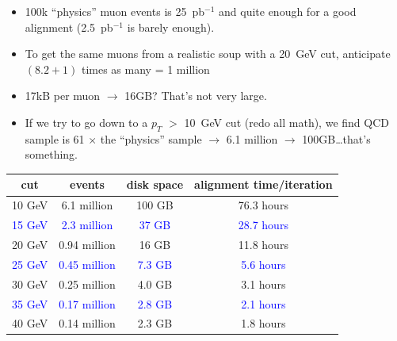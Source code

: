 \documentclass[compress]{beamer}
\begin{document}
\begin{frame}
\begin{itemize}
\item 100k ``physics'' muon events is 25~pb$^{-1}$ and quite enough for a good alignment (2.5~pb$^{-1}$ is barely enough).
\item To get the same muons from a realistic soup with a 20~GeV cut, anticipate $(8.2 + 1)$ times as many = 1 million
\item 17kB per muon $\to$ 16GB?  That's not very large.
\item If we try to go down to a $p_T$ $>$ 10~GeV cut (redo all math), we find QCD sample is 61 $\times$ the ``physics'' sample $\to$ 6.1 million $\to$ 100GB\ldots that's something.
\end{itemize}

\begin{center}
\begin{tabular}{c c c c}
cut & events & disk space & alignment time/iteration \\\hline
10 GeV & 6.1 million & 100 GB & 76.3 hours \\
\textcolor{blue}{15 GeV} & \textcolor{blue}{2.3 million} & \textcolor{blue}{37 GB} & \textcolor{blue}{28.7 hours} \\
20 GeV & 0.94 million & 16 GB & 11.8 hours \\
\textcolor{blue}{25 GeV} & \textcolor{blue}{0.45 million} & \textcolor{blue}{7.3 GB} & \textcolor{blue}{5.6 hours} \\
30 GeV & 0.25 million & 4.0 GB & 3.1 hours \\
\textcolor{blue}{35 GeV} & \textcolor{blue}{0.17 million} & \textcolor{blue}{2.8 GB} & \textcolor{blue}{2.1 hours} \\
40 GeV & 0.14 million & 2.3 GB & 1.8 hours \\
\end{tabular}
\end{center}
\end{frame}
\end{document}
